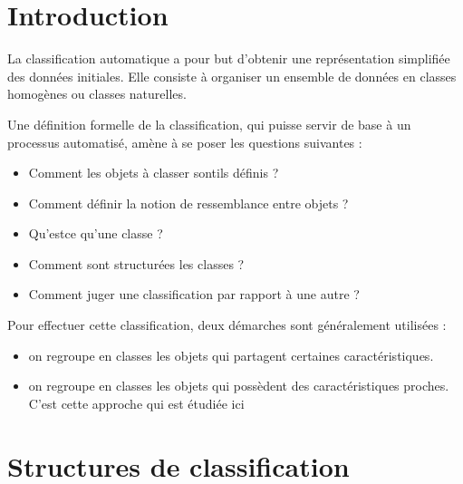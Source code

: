 \documentclass[letterpaper,10pt,french]{sphinxmanual}
\begin{document}
\section{Introduction}
\label{\detokenize{clustering:introduction}}
\sphinxAtStartPar
La classification automatique a pour but d’obtenir une représentation simplifiée des données initiales. Elle consiste à organiser un ensemble de données en classes homogènes ou classes naturelles.

\sphinxAtStartPar
Une définition formelle de la classification, qui puisse servir de base à un processus automatisé, amène à se poser les questions suivantes :
\begin{itemize}
\item {} 
\sphinxAtStartPar
Comment les objets à classer sont\sphinxhyphen{}ils définis ?

\item {} 
\sphinxAtStartPar
Comment définir la notion de ressemblance entre objets ?

\item {} 
\sphinxAtStartPar
Qu’est\sphinxhyphen{}ce qu’une classe ?

\item {} 
\sphinxAtStartPar
Comment sont structurées les classes ?

\item {} 
\sphinxAtStartPar
Comment juger une classification par rapport à une autre ?

\end{itemize}

\sphinxAtStartPar
Pour effectuer cette classification, deux démarches sont généralement utilisées :
\begin{itemize}
\item {} 
\sphinxAtStartPar
on regroupe en classes les objets qui partagent certaines caractéristiques.

\item {} 
\sphinxAtStartPar
on regroupe en classes les objets qui possèdent des caractéristiques proches. C’est cette approche qui est étudiée ici

\end{itemize}


\section{Structures de classification}
\label{\detokenize{clustering:structures-de-classification}}
\end{document}
